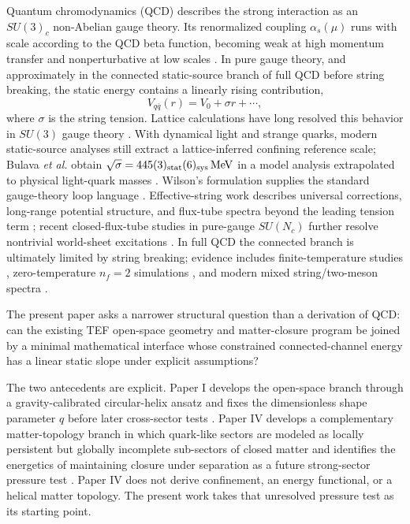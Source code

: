 \documentclass[10pt]{article}
\begin{document}
Quantum chromodynamics (QCD) describes the strong interaction as an $SU(3)_c$ non-Abelian gauge theory. Its renormalized coupling $\alpha_s(\mu)$ runs with scale according to the QCD beta function, becoming weak at high momentum transfer and nonperturbative at low scales \cite{PDGQCD2025}. In pure gauge theory, and approximately in the connected static-source branch of full QCD before string breaking, the static energy contains a linearly rising contribution,
\begin{equation}
V_{q\bar q}(r)=V_0+\sigma r+\cdots,
\label{eq:qcd_linear}
\end{equation}
where $\sigma$ is the string tension. Lattice calculations have long resolved this behavior in $SU(3)$ gauge theory \cite{BaliSchilling1992}. With dynamical light and strange quarks, modern static-source analyses still extract a lattice-inferred confining reference scale; Bulava \emph{et al.} obtain $\sqrt{\sigma}=445(3)_{\rm stat}(6)_{\rm sys}\,\mathrm{MeV}$ in a model analysis extrapolated to physical light-quark masses \cite{Bulava2024}. Wilson's formulation supplies the standard gauge-theory loop language \cite{Wilson1974}. Effective-string work describes universal corrections, long-range potential structure, and flux-tube spectra beyond the leading tension term \cite{LuscherWeisz2002,Brambilla2014}; recent closed-flux-tube studies in pure-gauge $SU(N_c)$ further resolve nontrivial world-sheet excitations \cite{Athenodorou2025}. In full QCD the connected branch is ultimately limited by string breaking; evidence includes finite-temperature studies \cite{DeTar1999}, zero-temperature $n_f=2$ simulations \cite{BaliStringBreaking2005}, and modern mixed string/two-meson spectra \cite{Bulava2024}.

The present paper asks a narrower structural question than a derivation of QCD: can the existing TEF open-space geometry and matter-closure program be joined by a minimal mathematical interface whose constrained connected-channel energy has a linear static slope under explicit assumptions?

The two antecedents are explicit. Paper I develops the open-space branch through a gravity-calibrated circular-helix ansatz and fixes the dimensionless shape parameter $q$ before later cross-sector tests \cite{WuWeakMixing}. Paper IV develops a complementary matter-topology branch in which quark-like sectors are modeled as locally persistent but globally incomplete sub-sectors of closed matter and identifies the energetics of maintaining closure under separation as a future strong-sector pressure test \cite{WuMatterSpace}. Paper IV does not derive confinement, an energy functional, or a helical matter topology. The present work takes that unresolved pressure test as its starting point.
\end{document}
